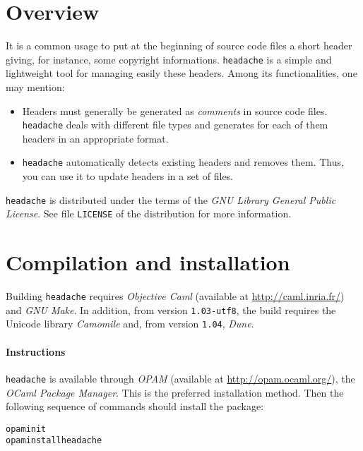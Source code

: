\documentclass{article}
\title{\headache{}}
\author{Vincent Simonet}
\date{November, 2002}
\newcommand{\mytt}[1]{\texttt{#1}}
\newcommand{\headache}{\mytt{headache}}
\begin{document}
\maketitle


\section{Overview}

It is a common usage to put at the beginning of source code files a
short header giving, for instance, some copyright informations.
\headache{} is a simple and lightweight tool for managing easily these
headers.  Among its functionalities, one may mention:
\begin{itemize}
\item Headers must generally be generated as \emph{comments} in source
  code files.  \headache{} deals with different file types and generates
  for each of them headers in an appropriate format.
\item \headache{} automatically detects existing headers and removes them.
  Thus, you can use it to update headers in a set of files.
\end{itemize}

\headache{} is distributed under the terms of the \emph{GNU Library General
  Public License}.  See file \mytt{LICENSE} of the distribution for
more information.


\section{Compilation and installation}

Building \headache{} requires \emph{Objective Caml} (available at
\url{http://caml.inria.fr/}) and \emph{GNU Make}.
In addition, from version \texttt{1.03-utf8}, the build requires the Unicode library \emph{Camomile} and, from version \texttt{1.04}, \emph{Dune}.

\paragraph{Instructions}

\headache{} is available through \emph{OPAM} (available at
\url{http://opam.ocaml.org/}), the \emph{OCaml Package Manager}.
This is the preferred installation method.
Then the following sequence of commands should install the package:
\begin{alltt}
  opam init
  opam install headache
\end{alltt}
\end{document}
